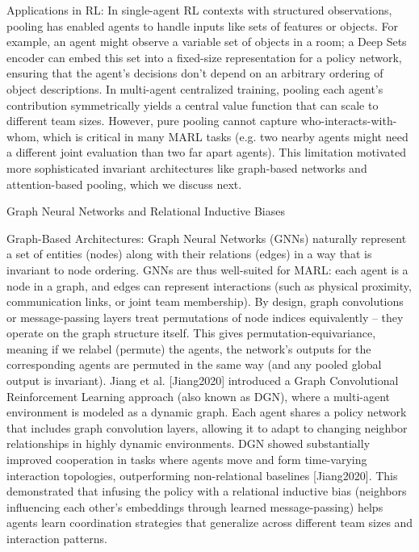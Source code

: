 \documentclass{article}
\begin{document}
Applications in RL: In single-agent RL contexts with structured observations, pooling has enabled agents to handle inputs like sets of features or objects. For example, an agent might observe a variable set of objects in a room; a Deep Sets encoder can embed this set into a fixed-size representation for a policy network, ensuring that the agent’s decisions don’t depend on an arbitrary ordering of object descriptions. In multi-agent centralized training, pooling each agent’s contribution symmetrically yields a central value function that can scale to different team sizes. However, pure pooling cannot capture who-interacts-with-whom, which is critical in many MARL tasks (e.g. two nearby agents might need a different joint evaluation than two far apart agents). This limitation motivated more sophisticated invariant architectures like graph-based networks and attention-based pooling, which we discuss next.

Graph Neural Networks and Relational Inductive Biases

Graph-Based Architectures: Graph Neural Networks (GNNs) naturally represent a set of entities (nodes) along with their relations (edges) in a way that is invariant to node ordering. GNNs are thus well-suited for MARL: each agent is a node in a graph, and edges can represent interactions (such as physical proximity, communication links, or joint team membership). By design, graph convolutions or message-passing layers treat permutations of node indices equivalently – they operate on the graph structure itself. This gives permutation-equivariance, meaning if we relabel (permute) the agents, the network’s outputs for the corresponding agents are permuted in the same way (and any pooled global output is invariant). Jiang et al. [Jiang2020] introduced a Graph Convolutional Reinforcement Learning approach (also known as DGN), where a multi-agent environment is modeled as a dynamic graph. Each agent shares a policy network that includes graph convolution layers, allowing it to adapt to changing neighbor relationships in highly dynamic environments. DGN showed substantially improved cooperation in tasks where agents move and form time-varying interaction topologies, outperforming non-relational baselines [Jiang2020]. This demonstrated that infusing the policy with a relational inductive bias (neighbors influencing each other’s embeddings through learned message-passing) helps agents learn coordination strategies that generalize across different team sizes and interaction patterns.
\end{document}
